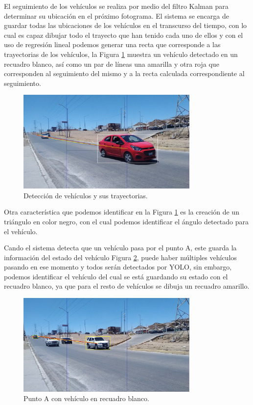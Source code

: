 El seguimiento de los vehículos se realiza por medio del filtro Kalman para determinar su ubicación en el próximo fotograma. El sistema se encarga de guardar todas las ubicaciones de los vehículos en el transcurso del tiempo, con lo cual es capaz dibujar todo el trayecto que han tenido cada uno de ellos y con el uso de regresión lineal podemos generar una recta que corresponde a las trayectorias de los vehículos, la Figura \ref{fig:LugarSeguimiento} muestra un vehículo detectado en un recuadro blanco, así como un par de líneas una amarilla y otra roja que corresponden al seguimiento del mismo y a la recta calculada correspondiente al seguimiento.

\begin{figure}[H]
    \centering
    \includegraphics[width=0.8\textwidth]{Metodologia/imgs/Seguimiento.jpg}
    \caption{Detección de vehículos y sus trayectorias.}
    \label{fig:LugarSeguimiento}
\end{figure}

Otra característica que podemos identificar en la Figura \ref{fig:LugarSeguimiento} es la creación de un triángulo en color negro, con el cual podemos identificar el ángulo detectado para el vehículo.

Cando el sistema detecta que un vehículo pasa por el punto A, este guarda la información del estado del vehículo Figura \ref{fig:PuntoA}, puede haber múltiples vehículos pasando en ese momento y todos serán detectados por YOLO, sin embargo, podemos identificar el vehículo del cual se está guardando su estado con el recuadro blanco, ya que para el resto de vehículos se dibuja un recuadro amarillo.

\begin{figure}[H]
    \centering
    \includegraphics[width=0.8\textwidth]{Metodologia/imgs/Punto_A.jpg}
    \caption{Punto A con vehículo en recuadro blanco.}
    \label{fig:PuntoA}
\end{figure}

